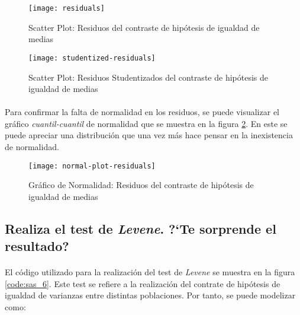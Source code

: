 \documentclass[11pt]{article}
\begin{document}
      \begin{figure}[!h]
        \centering
        \begin{minipage}{.49\textwidth}
          \centering
          \texttt{[image: residuals]}
          \caption{Scatter Plot: Residuos del contraste de hipótesis de igualdad de medias}
          \label{fig:scatter-plot-residuals}
        \end{minipage}
        \begin{minipage}{.49\textwidth}
          \centering
          \texttt{[image: studentized-residuals]}
          \caption{Scatter Plot: Residuos Studentizados del contraste de hipótesis de igualdad de medias}
          \label{fig:scatter-plot-studentized-residuals}
        \end{minipage}
      \end{figure}

      \paragraph{}
      Para confirmar la falta de normalidad en los residuos, se puede visualizar el gráfico \emph{cuantil-cuantil} de normalidad que se muestra en la figura \ref{img:normal-plot-residuals}. En este se puede apreciar una distribución que una vez más hace pensar en la inexistencia de normalidad.

      \begin{figure}[!h]
        \centering
        \texttt{[image: normal-plot-residuals]}
        \caption{Gráfico de Normalidad: Residuos del contraste de hipótesis de igualdad de medias}
        \label{img:normal-plot-residuals}
      \end{figure}

    \subsection{Realiza el test de \emph{Levene}. ?`Te sorprende el resultado?}
    \label{sec:e3}

      \paragraph{}
      El código utilizado para la realización del test de \emph{Levene} se muestra en la figura \ref{code:sas_6}. Este test se refiere a la realización del contrate de hipótesis de igualdad de varianzas entre distintas poblaciones. Por tanto, se puede modelizar como:
\end{document}
